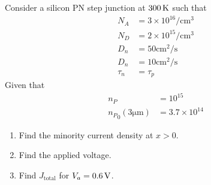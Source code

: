 \documentclass[titlepage, fleqn, a4paper, 12pt, twoside]{article}
\theoremstyle{definition}
\theoremstyle{theorem}
\begin{document}
\begin{question}
	Consider a silicon PN step junction at $300 \kelvin$ such that
	\begin{align*}
		N_A &= 3 \times 10^{16} \si{\per\centi\metre\cubed}\\
		N_D &= 2 \times 10^{15} \si{\per\centi\metre\cubed}\\
		D_n &= 50 \si{\centi\metre\squared\per\second}\\
		D_n &= 10 \si{\centi\metre\squared\per\second}\\
		\tau_n &= \tau_p
	\end{align*}
	Given that
	\begin{align*}
		n_P &= 10^{15}\\
		{n_P}_0(3 \si{\micro\metre}) &= 3.7 \times 10^{14}
	\end{align*}
	\begin{enumerate}
		\item Find the minority current density at $x > 0$.
		\item Find the applied voltage.
		\item Find $J_{\text{total}}$ for $V_a = 0.6 \volt$.
	\end{enumerate}
\end{question}
\end{document}
